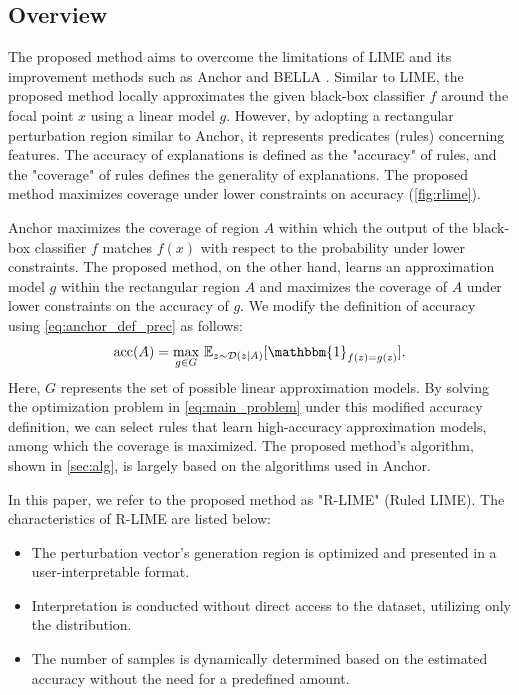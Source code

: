 \documentclass[runningheads]{llncs}
\begin{document}
\subsection{Overview}
The proposed method aims to overcome the limitations of LIME \cite{ribeiro2016why} and its improvement methods such as Anchor \cite{ribeiro2018anchors} and BELLA \cite{radulovic2023bella}. Similar to LIME, the proposed method locally approximates the given black-box classifier $f$ around the focal point $x$ using a linear model $g$. However, by adopting a rectangular perturbation region similar to Anchor, it represents predicates (rules) concerning features. The accuracy of explanations is defined as the "accuracy" of rules, and the "coverage" of rules defines the generality of explanations. The proposed method maximizes coverage under lower constraints on accuracy (\cref{fig:rlime}).

Anchor maximizes the coverage of region $A$ within which the output of the black-box classifier $f$ matches $f(x)$ with respect to the probability under lower constraints. The proposed method, on the other hand, learns an approximation model $g$ within the rectangular region $A$ and maximizes the coverage of $A$ under lower constraints on the accuracy of $g$. We modify the definition of accuracy using \cref{eq:anchor_def_prec} as follows:
\begin{equation}
  \Prec(A)=\underset{g\in G}{\max}\ \mathbb{E}_{z\sim\mathcal{D}(z|A)}
  [\mathbbm{1}_{f(z)=g(z)}]. \label{eq:def_prec}
\end{equation}
Here, $G$ represents the set of possible linear approximation models. By solving the optimization problem in \cref{eq:main_problem} under this modified accuracy definition, we can select rules that learn high-accuracy approximation models, among which the coverage is maximized. The proposed method's algorithm, shown in \cref{sec:alg}, is largely based on the algorithms used in Anchor.

In this paper, we refer to the proposed method as "R-LIME" (Ruled LIME). The characteristics of R-LIME are listed below:
\begin{itemize}
  \item The perturbation vector's generation region is optimized and presented in a user-interpretable format.
  \item Interpretation is conducted without direct access to the dataset, utilizing only the distribution.
  \item The number of samples is dynamically determined based on the estimated accuracy without the need for a predefined amount.
\end{itemize}
\end{document}
